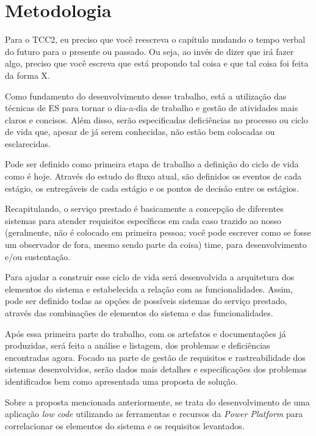 
\chapter{Metodologia}\label{chap:metodologia}

{\color{red} Para o TCC2, eu preciso que você reescreva o capítulo mudando o tempo verbal do futuro para o presente ou passado. Ou seja, ao invés de dizer que irá fazer algo, preciso que você escreva que está propondo tal coisa e que tal coisa foi feita da forma X.}

Como fundamento do desenvolvimento desse trabalho, está a utilização das 
técnicas de ES para tornar o dia-a-dia de trabalho e gestão de 
atividades mais claros e concisos. Além disso, serão especificadas deficiências no 
processo ou ciclo de vida que, apesar de já serem conhecidas, não estão bem 
colocadas ou esclarecidas. 

Pode ser definido como primeira etapa de trabalho a definição do ciclo de vida como 
é hoje. Através do estudo do fluxo atual, são definidos os eventos de cada estágio, 
os entregáveis de cada estágio e os pontos de decisão entre os 
estágios. 

Recapitulando, o serviço prestado é basicamente a concepção de diferentes 
sistemas para atender requisitos específicos em cada caso trazido ao nosso {\color{red}(geralmente, não é colocado em primeira pessoa; você pode escrever como se fosse um observador de fora, mesmo sendo parte da coisa)} time, 
para desenvolvimento e/ou sustentação.   

Para ajudar a construir esse ciclo de vida será desenvolvida a arquitetura dos 
elementos do sistema e estabelecida a relação com as funcionalidades. Assim, pode 
ser definido todas as opções de possíveis sistemas do serviço prestado, através das 
combinações de elementos do sistema e das funcionalidades. 

Após essa primeira parte do trabalho, com os artefatos e documentações já 
produzidas, será feita a análise e listagem, dos problemas e deficiências 
encontradas agora. Focado na parte de gestão de requisitos e rastreabilidade dos 
sistemas desenvolvidos, serão dados mais detalhes e especificações dos problemas 
identificados bem como apresentada uma proposta de solução. 

Sobre a proposta mencionada anteriormente, se trata do desenvolvimento de uma 
aplicação \textit{low code} utilizando as ferramentas e recursos da \textit{Power Platform} para 
correlacionar os elementos do sistema e os requisitos levantados. 

